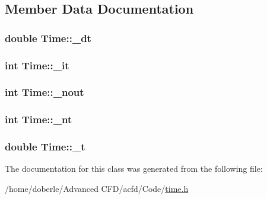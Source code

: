 \subsection{Member Data Documentation}
\subsubsection[{\texorpdfstring{\+\_\+dt}{_dt}}]{\setlength{\rightskip}{0pt plus 5cm}double Time\+::\+\_\+dt\hspace{0.3cm}{\ttfamily [protected]}}\hypertarget{class_time_ac5b122ce34cac3661357f0d3a7883771}{}\label{class_time_ac5b122ce34cac3661357f0d3a7883771}
\subsubsection[{\texorpdfstring{\+\_\+it}{_it}}]{\setlength{\rightskip}{0pt plus 5cm}int Time\+::\+\_\+it\hspace{0.3cm}{\ttfamily [protected]}}\hypertarget{class_time_a3c9e1bfeb4011d025e13822cb5f5c505}{}\label{class_time_a3c9e1bfeb4011d025e13822cb5f5c505}
\subsubsection[{\texorpdfstring{\+\_\+nout}{_nout}}]{\setlength{\rightskip}{0pt plus 5cm}int Time\+::\+\_\+nout\hspace{0.3cm}{\ttfamily [protected]}}\hypertarget{class_time_a587de2dad9055fd5600a932ec6a38b4e}{}\label{class_time_a587de2dad9055fd5600a932ec6a38b4e}
\subsubsection[{\texorpdfstring{\+\_\+nt}{_nt}}]{\setlength{\rightskip}{0pt plus 5cm}int Time\+::\+\_\+nt\hspace{0.3cm}{\ttfamily [protected]}}\hypertarget{class_time_a280ffde054834baa2dd58b9faa745fb9}{}\label{class_time_a280ffde054834baa2dd58b9faa745fb9}
\subsubsection[{\texorpdfstring{\+\_\+t}{_t}}]{\setlength{\rightskip}{0pt plus 5cm}double Time\+::\+\_\+t\hspace{0.3cm}{\ttfamily [protected]}}\hypertarget{class_time_a4ee3f4042a1b37b86c3ae7c8bc3a036e}{}\label{class_time_a4ee3f4042a1b37b86c3ae7c8bc3a036e}


The documentation for this class was generated from the following file\+:\begin{DoxyCompactItemize}
\item 
/home/doberle/\+Advanced C\+F\+D/acfd/\+Code/\hyperlink{time_8h}{time.\+h}\end{DoxyCompactItemize}
